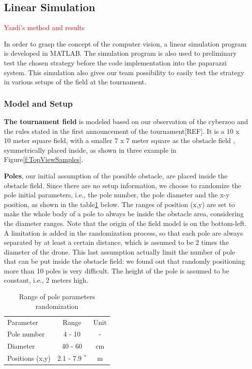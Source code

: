 \subsection{Linear Simulation}
\label{subsec:lin_sim}
\textcolor{red}{Yazdi's method and results}

In order to grasp the concept of the computer vision, a linear simulation program is developed in MATLAB. The simulation program is also used to preliminary test the chosen strategy before the code implementation into the paparazzi system. This simulation also gives our team possibility to easily test the strategy in various setups of the field at the tournament. 

\subsubsection{Model and Setup}
\textbf{The tournament field} is modeled based on our observation of the cyberzoo and the rules stated in the first announcement of the tournament[REF]. It is a 10 x 10 meter square field, with a smaller 7 x 7 meter square as the obstacle field , symmetrically placed inside, as shown in three example in Figure\ref{f:TopViewSamples}.

\textbf{Poles}, our initial assumption of the possible obstacle, are placed inside the obstacle field. Since there are no setup information, we choose to randomize the pole initial parameters, i.e., the pole number, the pole diameter and the x-y position, as shown in the table\ref{t:RandomPole} below. The ranges of position (x,y) are set to make the whole body of a pole to always be inside the obstacle area, considering the diameter ranges. Note that the origin of the field model is on the bottom-left. A limitation is added in the randomization process, so that each pole are always separated by at least a certain distance, which is assumed to be 2 times the diameter of the drone. This last assumption actually limit the number of pole that can be put inside the obstacle field: we found out that randomly positioning more than 10 poles is very difficult. The height of the pole is assumed  to be constant, i.e., 2 meters high. 

\begin{table}
\caption{Range of pole parameters randomization}
\label{t:RandomPole}
\begin{tabular}{lcc}
\hline \hline
Parameter & Range & Unit \\
Pole number & 4 - 10 & - \\
Diameter & 40 - 60 & cm \\
Positions (x,y) & 2.1 - 7.9 $^*$ & m \\
\end{tabular}
\end{table}

